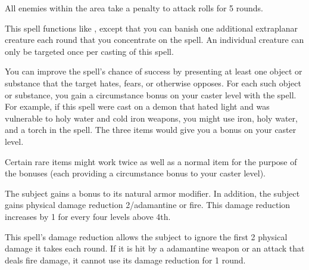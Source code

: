 \begin{spelleffect}
  All enemies within the area take a  penalty to attack rolls for 5 rounds.
\end{spelleffect}

\spellrng{\rngmed}
\begin{spelleffect}
  This spell functions like , except that you can banish one additional extraplanar creature each round that you concentrate on the spell. An individual creature can only be targeted once per casting of this spell.
\end{spelleffect}
\begin{spellnotes}
  You can improve the spell's chance of success by presenting at least one object or substance that the target hates, fears, or otherwise opposes. For each such object or substance, you gain a  circumstance bonus on your caster level with the spell. For example, if this spell were cast on a demon that hated light and was vulnerable to holy water and cold iron weapons, you might use iron, holy water, and a torch in the spell. The three items would give you a  bonus on your caster level. 
  \par Certain rare items might work twice as well as a normal item for the purpose of the bonuses (each providing a  circumstance bonus to your caster level).
\end{spellnotes}

\spellrng{\rngtouch}
\spelldur{\durshort}
\begin{spelleffect}
  The subject gains a  bonus to its natural armor modifier. \bonusscalingdescription In addition, the subject gains physical damage reduction 2/adamantine or fire. This damage reduction increases by 1 for every four levels above 4th.
\end{spelleffect}
\begin{spellnotes}
  This spell's damage reduction allows the subject to ignore the first 2 physical damage it takes each round. If it is hit by a adamantine weapon or an attack that deals fire damage, it cannot use its damage reduction for 1 round.
\end{spellnotes}

